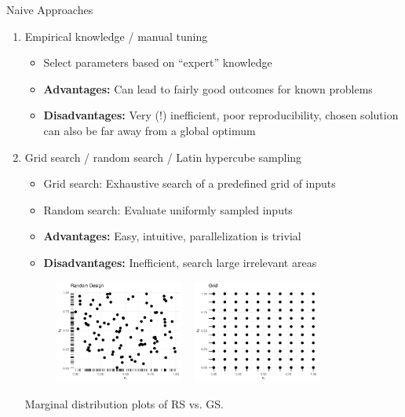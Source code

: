 \documentclass[11pt,compress,t,notes=noshow, xcolor=table]{beamer}
\begin{document}
\begin{vbframe}{Naive Approaches}
\begin{enumerate}
\item Empirical knowledge / manual tuning
\begin{itemize}
\item Select parameters based on \enquote{expert} knowledge 
\item \textbf{Advantages:} Can lead to fairly good outcomes for known problems
\item \textbf{Disadvantages:} Very (!) inefficient, poor reproducibility, chosen solution can also be far away from a global optimum
\end{itemize}

\framebreak 
\item Grid search / random search / Latin hypercube sampling
\begin{itemize}
\item Grid search: Exhaustive search of a predefined grid of inputs
\item Random search: Evaluate uniformly sampled inputs 
\item \textbf{Advantages: } Easy, intuitive, parallelization is trivial
\item \textbf{Disadvantages: } Inefficient, search large irrelevant areas
\end{itemize}

\begin{center}
\begin{figure}
\includegraphics[width=0.4\textwidth]{figure_man/black_box_0.png} ~ \includegraphics[width=0.4\textwidth]{figure_man/black_box_1.png}
\end{figure}
\begin{footnotesize}
Marginal distribution plots of RS vs. GS.
\end{footnotesize}
\end{center}



\end{enumerate}
\end{vbframe}
\end{document}
